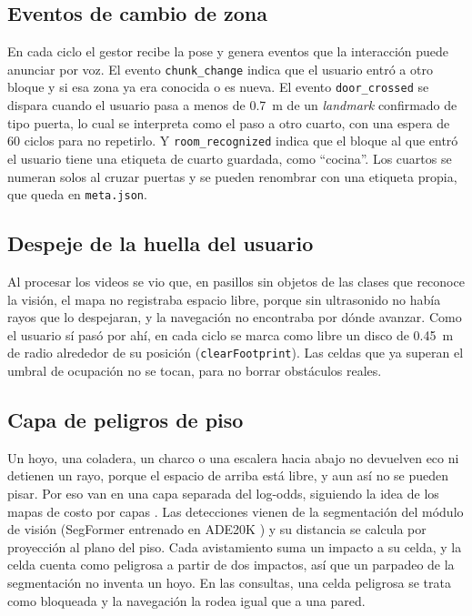 \subsection{Eventos de cambio de zona}

En cada ciclo el gestor recibe la pose y genera eventos que la interacción puede
anunciar por voz. El evento \texttt{chunk\_change} indica que el usuario entró a otro
bloque y si esa zona ya era conocida o es nueva. El evento \texttt{door\_crossed} se
dispara cuando el usuario pasa a menos de 0.7~m de un \emph{landmark} confirmado de tipo
puerta, lo cual se interpreta como el paso a otro cuarto, con una espera de 60 ciclos
para no repetirlo. Y \texttt{room\_recognized} indica que el bloque al que entró el
usuario tiene una etiqueta de cuarto guardada, como ``cocina''. Los cuartos se numeran
solos al cruzar puertas y se pueden renombrar con una etiqueta propia, que queda en
\texttt{meta.json}.

\subsection{Despeje de la huella del usuario}

Al procesar los videos se vio que, en pasillos sin objetos de las clases que reconoce la
visión, el mapa no registraba espacio libre, porque sin ultrasonido no había rayos que lo
despejaran, y la navegación no encontraba por dónde avanzar. Como el usuario sí pasó por
ahí, en cada ciclo se marca como libre un disco de 0.45~m de radio alrededor de su
posición (\texttt{clearFootprint}). Las celdas que ya superan el umbral de ocupación no
se tocan, para no borrar obstáculos reales.

\subsection{Capa de peligros de piso}

Un hoyo, una coladera, un charco o una escalera hacia abajo no devuelven eco ni detienen
un rayo, porque el espacio de arriba está libre, y aun así no se pueden pisar. Por eso
van en una capa separada del log-odds, siguiendo la idea de los mapas de costo por capas
\cite{lu2014layered}. Las detecciones vienen de la segmentación del módulo de visión
(SegFormer entrenado en ADE20K \cite{xie2021segformer, zhou2017ade20k}) y su distancia se
calcula por proyección al plano del piso. Cada avistamiento suma un impacto a su celda, y
la celda cuenta como peligrosa a partir de dos impactos, así que un parpadeo de la
segmentación no inventa un hoyo. En las consultas, una celda peligrosa se trata como
bloqueada y la navegación la rodea igual que a una pared.

